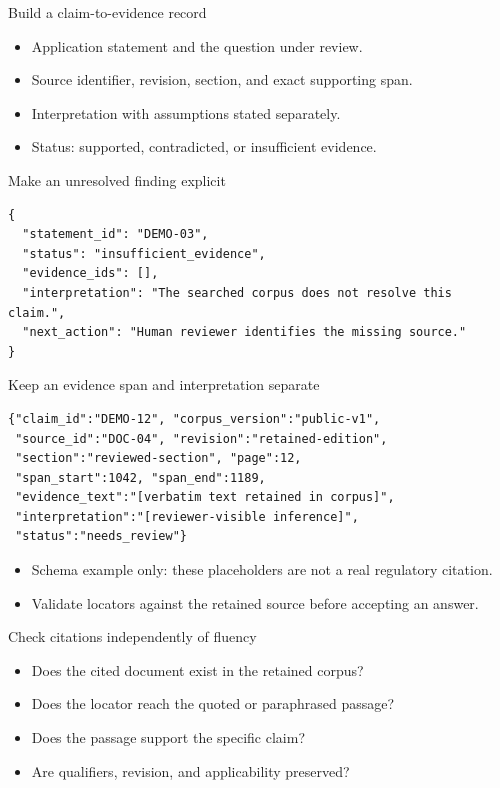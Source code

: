 \documentclass[aspectratio=169,11pt]{beamer}
\begin{document}
\begin{frame}[t,fragile]{Build a claim-to-evidence record}
\fontsize{11.5}{14}\selectfont
\begin{itemize}\setlength{\itemsep}{2mm}
\item Application statement and the question under review.
\item Source identifier, revision, section, and exact supporting span.
\item Interpretation with assumptions stated separately.
\item Status: supported, contradicted, or insufficient evidence.
\end{itemize}
\end{frame}
\begin{frame}[t,fragile]{Make an unresolved finding explicit}
\begin{lstlisting}
{
  "statement_id": "DEMO-03",
  "status": "insufficient_evidence",
  "evidence_ids": [],
  "interpretation": "The searched corpus does not resolve this claim.",
  "next_action": "Human reviewer identifies the missing source."
}
\end{lstlisting}
\end{frame}
\begin{frame}[t,fragile]{Keep an evidence span and interpretation separate}
\begin{lstlisting}
{"claim_id":"DEMO-12", "corpus_version":"public-v1",
 "source_id":"DOC-04", "revision":"retained-edition",
 "section":"reviewed-section", "page":12,
 "span_start":1042, "span_end":1189,
 "evidence_text":"[verbatim text retained in corpus]",
 "interpretation":"[reviewer-visible inference]",
 "status":"needs_review"}
\end{lstlisting}
\fontsize{10.5}{12.5}\selectfont
\begin{itemize}\setlength{\itemsep}{2mm}
\item Schema example only: these placeholders are not a real regulatory citation.
\item Validate locators against the retained source before accepting an answer.
\end{itemize}
\end{frame}
\begin{frame}[t,fragile]{Check citations independently of fluency}
\fontsize{11.5}{14}\selectfont
\begin{itemize}\setlength{\itemsep}{2mm}
\item Does the cited document exist in the retained corpus?
\item Does the locator reach the quoted or paraphrased passage?
\item Does the passage support the specific claim?
\item Are qualifiers, revision, and applicability preserved?
\end{itemize}
\end{frame}
\end{document}
